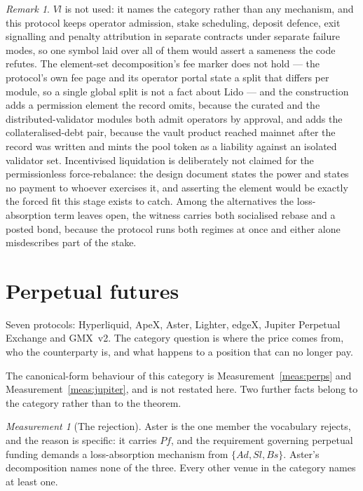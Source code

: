 \documentclass[11pt,reqno]{amsart}
\theoremstyle{plain}
\theoremstyle{definition}
\theoremstyle{remark}
\newtheorem{measurement}[theorem]{Measurement}
\newtheorem{remark}[theorem]{Remark}
\begin{document}
\begin{remark}
$Vl$ is not used: it names the category rather than any mechanism, and this protocol keeps operator admission, stake scheduling, deposit defence, exit signalling and penalty attribution in separate contracts under separate failure modes, so one symbol laid over all of them would assert a sameness the code refutes. The element-set decomposition's fee marker does not hold --- the protocol's own fee page and its operator portal state a split that differs per module, so a single global split is not a fact about Lido --- and the construction adds a permission element the record omits, because the curated and the distributed-validator modules both admit operators by approval, and adds the collateralised-debt pair, because the vault product reached mainnet after the record was written and mints the pool token as a liability against an isolated validator set. Incentivised liquidation is deliberately not claimed for the permissionless force-rebalance: the design document states the power and states no payment to whoever exercises it, and asserting the element would be exactly the forced fit this stage exists to catch. Among the alternatives the loss-absorption term leaves open, the witness carries both socialised rebase and a posted bond, because the protocol runs both regimes at once and either alone misdescribes part of the stake.
\end{remark}

\section{Perpetual futures}\label{sec:cat:perp}

Seven protocols: Hyperliquid, ApeX, Aster, Lighter, edgeX, Jupiter Perpetual
Exchange and GMX~v2. The category question is where the price comes from, who
the counterparty is, and what happens to a position that can no longer pay.

The canonical-form behaviour of this category is
Measurement~\ref{meas:perps} and Measurement~\ref{meas:jupiter}, and is not
restated here. Two further facts belong to the category rather than to the
theorem.

\begin{measurement}[The rejection]\label{meas:cat:perprej}
Aster is the one member the vocabulary rejects, and the reason is specific: it
carries $Pf$, and the requirement governing perpetual funding demands a
loss-absorption mechanism from $\{Ad, Sl, Bs\}$. Aster's decomposition names
none of the three. Every other venue in the category names at least one.
\end{measurement}
\end{document}
